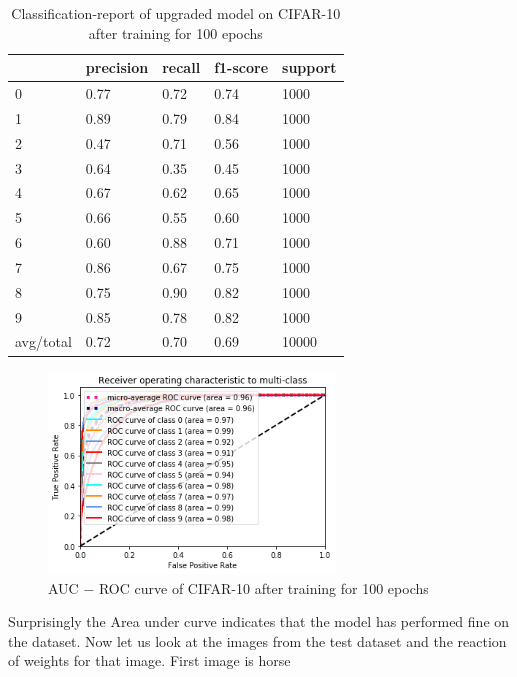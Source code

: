 \begin{table}[]
\centering
\begin{tabular}{|l|l|l|l|l|}
\hline
          & precision & recall & f1-score & support \\ \hline
0         & 0.77      & 0.72   & 0.74     & 1000     \\ \hline
1         & 0.89      & 0.79   & 0.84     & 1000    \\ \hline
2         & 0.47      & 0.71   & 0.56     & 1000    \\ \hline
3         & 0.64      & 0.35   & 0.45     & 1000    \\ \hline
4         & 0.67      & 0.62   & 0.65     & 1000    \\ \hline
5         & 0.66      & 0.55   & 0.60     & 1000     \\ \hline
6         & 0.60      & 0.88   & 0.71     & 1000     \\ \hline
7         & 0.86      & 0.67   & 0.75     & 1000   \\ \hline
8         & 0.75      & 0.90   & 0.82     & 1000     \\ \hline
9         & 0.85      & 0.78   & 0.82     & 1000    \\ \hline
avg/total & 0.72      & 0.70   & 0.69     & 10000   \\ \hline
\end{tabular}
\caption{Classification-report of upgraded model on CIFAR-10 after training for          100 epochs}
\end{table}

\newpage\begin{figure}[h]
    \centering
    \includegraphics[width=0.68\textwidth]{thesis_template/images/cifroc.png}
    \caption{\small AUC $-$ ROC curve of CIFAR-10 after training for 100 epochs}
    \label{}
    \end{figure}

 \noindent Surprisingly the Area under curve indicates that the model has performed fine on the dataset. Now let us look at the images from the test dataset and the reaction of weights for that image. First image is horse  


